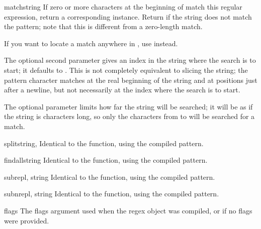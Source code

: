\begin{methoddesc}[RegexObject]{match}{string}
  If zero or more characters at the beginning of  match
  this regular expression, return a corresponding
   instance.  Return  if the string does not
  match the pattern; note that this is different from a zero-length
  match.

    If you want to locate a match anywhere in
  , use  instead.

  The optional second parameter  gives an index in the string
  where the search is to start; it defaults to .  This is not
  completely equivalent to slicing the string; the  pattern
  character matches at the real beginning of the string and at positions
  just after a newline, but not necessarily at the index where the search
  is to start.

  The optional parameter  limits how far the string will
  be searched; it will be as if the string is  characters
  long, so only the characters from  to  will be
  searched for a match.
\end{methoddesc}

\begin{methoddesc}[RegexObject]{split}{string, }
Identical to the  function, using the compiled pattern.
\end{methoddesc}

\begin{methoddesc}[RegexObject]{findall}{string}
Identical to the  function, using the compiled pattern.
\end{methoddesc}

\begin{methoddesc}[RegexObject]{sub}{repl, string}
Identical to the  function, using the compiled pattern.
\end{methoddesc}

\begin{methoddesc}[RegexObject]{subn}{repl, string}
Identical to the  function, using the compiled pattern.
\end{methoddesc}


\begin{memberdesc}[RegexObject]{flags}
The flags argument used when the regex object was compiled, or
 if no flags were provided.
\end{memberdesc}

